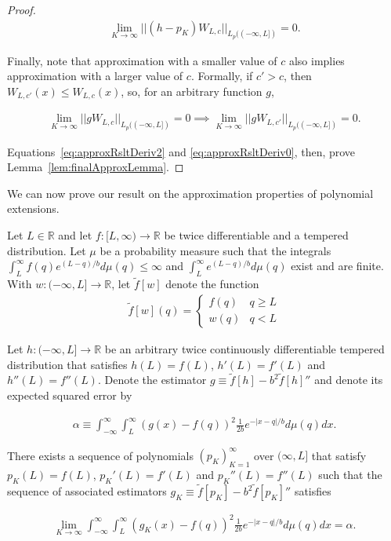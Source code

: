 \documentclass[11pt]{article}
\newcommand{\R}{\mathbb{R}}
\begin{document}
\begin{proof}
\begin{align} \label{eq:approxRsltDeriv0}
    \lim_{K \to \infty} ||(h - p_K)W_{L,c}||_{L_p((-\infty,L])} = 0.
\end{align}

Finally, note that approximation with a smaller value of $c$ also implies approximation with a larger value of $c$. Formally, if $c' > c$, then $W_{L,c'}(x) \leq W_{L,c}(x)$, so, for an arbitrary function $g$,

\begin{align}
    \lim_{K \to \infty} ||gW_{L,c}||_{L_p((-\infty,L])} = 0
    \implies \lim_{K \to \infty} ||gW_{L,c'}||_{L_p((-\infty,L])} = 0.
\end{align}

Equations~\ref{eq:approxRsltDeriv2} and \ref{eq:approxRsltDeriv0}, then, prove Lemma~\ref{lem:finalApproxLemma}.

\end{proof}

We can now prove our result on the approximation properties of polynomial extensions.

\begin{theorem}
    Let $L \in \R$ and let $f:[L,\infty) \to \R$ be twice differentiable and a tempered distribution. Let $\mu$ be a probability measure such that the integrals $\int_L^\infty f(q) e^{(L-q)/b} d\mu(q) \leq \infty$ and $\int_L^\infty e^{(L-q)/b} d\mu(q)$ exist and are finite. With $w:(-\infty,L] \to \R$, let $\tilde{f}[w]$ denote the function
    \begin{align}
    \tilde{f}[w](q) = \left\{\begin{matrix} f(q) & q \ge L\\ w(q) & q < L\end{matrix}  \right.
    \end{align}
    
    Let $h:(-\infty,L] \to \R$ be an arbitrary twice continuously differentiable tempered distribution that satisfies $h(L) = f(L)$, $h'(L) = f'(L)$ and $h''(L) = f''(L)$. Denote the estimator $g \equiv \tilde{f}[h] - b^2 \tilde{f}[h]''$ and denote its expected squared error by 

    \begin{align}
        \alpha \equiv \int_{-\infty}^\infty \int_L^\infty \left(g(x) - f(q)\right)^2 \frac{1}{2b} e^{-|x-q|/b} d\mu(q) dx.
    \end{align}

    There exists a sequence of polynomials $(p_K)_{K=1}^\infty$ over $(\infty,L]$ that satisfy $p_K(L) = f(L)$, $p_K'(L) = f'(L)$ and $p_K''(L) = f''(L)$ such that the sequence of associated estimators $g_K \equiv \tilde{f}[p_K] - b^2 \tilde{f}[p_K]''$ satisfies

    \begin{align}
        \lim_{K \to \infty} \int_{-\infty}^\infty \int_L^\infty \left(g_K(x) - f(q)\right)^2 \frac{1}{2b} e^{-|x-q|/b} d\mu(q) dx = \alpha.
    \end{align}
\end{theorem}
\end{document}
